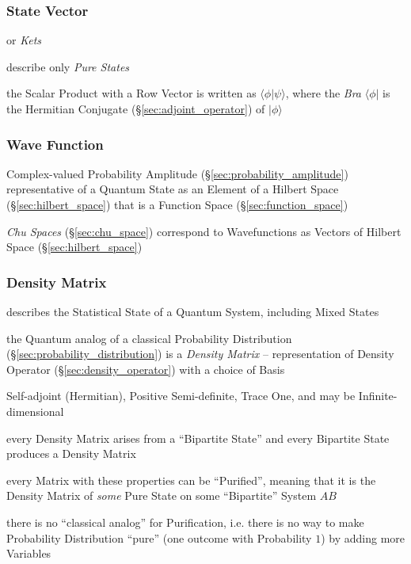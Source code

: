\subsubsection{State Vector}\label{sec:state_vector}

or \emph{Kets}

describe only \emph{Pure States}

the Scalar Product with a Row Vector is written as $\langle\phi|\psi\rangle$,
where the \emph{Bra} $\langle\phi|$ is the Hermitian Conjugate
(\S\ref{sec:adjoint_operator}) of $|\phi\rangle$



\subsubsection{Wave Function}\label{sec:wave_function}

Complex-valued Probability Amplitude (\S\ref{sec:probability_amplitude})
representative of a Quantum State as an Element of a Hilbert Space
(\S\ref{sec:hilbert_space}) that is a Function Space
(\S\ref{sec:function_space})

\fist \emph{Chu Spaces} (\S\ref{sec:chu_space}) correspond to Wavefunctions as
Vectors of Hilbert Space (\S\ref{sec:hilbert_space})



\subsubsection{Density Matrix}\label{sec:density_matrix}

describes the Statistical State of a Quantum System, including Mixed States

the Quantum analog of a classical Probability Distribution
(\S\ref{sec:probability_distribution}) is a \emph{Density Matrix} --
representation of Density Operator (\S\ref{sec:density_operator}) with a choice
of Basis

Self-adjoint (Hermitian), Positive Semi-definite, Trace One, and may be
Infinite-dimensional

every Density Matrix arises from a ``Bipartite State'' and every Bipartite State
produces a Density Matrix

every Matrix with these properties can be ``Purified'', meaning that it is the
Density Matrix of \emph{some} Pure State on some ``Bipartite'' System $AB$

there is no ``classical analog'' for Purification, i.e. there is no way to make
Probability Distribution ``pure'' (one outcome with Probability $1$) by adding
more Variables

